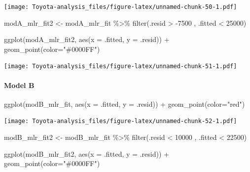 \documentclass[
]{article}
\newenvironment{Shaded}{\begin{snugshade}}{\end{snugshade}}
\newcommand{\AttributeTok}[1]{\textcolor[rgb]{0.77,0.63,0.00}{#1}}
\newcommand{\DecValTok}[1]{\textcolor[rgb]{0.00,0.00,0.81}{#1}}
\newcommand{\FunctionTok}[1]{\textcolor[rgb]{0.00,0.00,0.00}{#1}}
\newcommand{\NormalTok}[1]{#1}
\newcommand{\OtherTok}[1]{\textcolor[rgb]{0.56,0.35,0.01}{#1}}
\newcommand{\SpecialCharTok}[1]{\textcolor[rgb]{0.00,0.00,0.00}{#1}}
\newcommand{\StringTok}[1]{\textcolor[rgb]{0.31,0.60,0.02}{#1}}
\begin{document}
\texttt{[image: Toyota-analysis\_files/figure-latex/unnamed-chunk-50-1.pdf]}

\begin{Shaded}
\begin{Highlighting}[]
\NormalTok{modA\_mlr\_fit2 }\OtherTok{\textless{}{-}}\NormalTok{ modA\_mlr\_fit }\SpecialCharTok{\%\textgreater{}\%} 
  \FunctionTok{filter}\NormalTok{(.resid }\SpecialCharTok{\textgreater{}} \SpecialCharTok{{-}}\DecValTok{7500}\NormalTok{ ,}
\NormalTok{         .fitted }\SpecialCharTok{\textless{}} \DecValTok{25000}\NormalTok{) }

\FunctionTok{ggplot}\NormalTok{(modA\_mlr\_fit2, }\FunctionTok{aes}\NormalTok{(}\AttributeTok{x =}\NormalTok{ .fitted, }\AttributeTok{y =}\NormalTok{ .resid)) }\SpecialCharTok{+}
  \FunctionTok{geom\_point}\NormalTok{(}\AttributeTok{color=}\StringTok{"\#0000FF"}\NormalTok{)}
\end{Highlighting}
\end{Shaded}

\texttt{[image: Toyota-analysis\_files/figure-latex/unnamed-chunk-51-1.pdf]}

\hypertarget{model-b-11}{%
\paragraph{Model B}\label{model-b-11}}

\begin{Shaded}
\begin{Highlighting}[]
\FunctionTok{ggplot}\NormalTok{(modB\_mlr\_fit, }\FunctionTok{aes}\NormalTok{(}\AttributeTok{x =}\NormalTok{ .fitted, }\AttributeTok{y =}\NormalTok{ .resid)) }\SpecialCharTok{+}
  \FunctionTok{geom\_point}\NormalTok{(}\AttributeTok{color=}\StringTok{"red"}\NormalTok{)}
\end{Highlighting}
\end{Shaded}

\texttt{[image: Toyota-analysis\_files/figure-latex/unnamed-chunk-52-1.pdf]}

\begin{Shaded}
\begin{Highlighting}[]
\NormalTok{modB\_mlr\_fit2 }\OtherTok{\textless{}{-}}\NormalTok{ modB\_mlr\_fit }\SpecialCharTok{\%\textgreater{}\%} 
  \FunctionTok{filter}\NormalTok{(.resid }\SpecialCharTok{\textless{}} \DecValTok{10000}\NormalTok{ ,}
\NormalTok{         .fitted }\SpecialCharTok{\textless{}} \DecValTok{22500}\NormalTok{) }

\FunctionTok{ggplot}\NormalTok{(modB\_mlr\_fit2, }\FunctionTok{aes}\NormalTok{(}\AttributeTok{x =}\NormalTok{ .fitted, }\AttributeTok{y =}\NormalTok{ .resid)) }\SpecialCharTok{+}
  \FunctionTok{geom\_point}\NormalTok{(}\AttributeTok{color=}\StringTok{"\#0000FF"}\NormalTok{)}
\end{Highlighting}
\end{Shaded}
\end{document}
